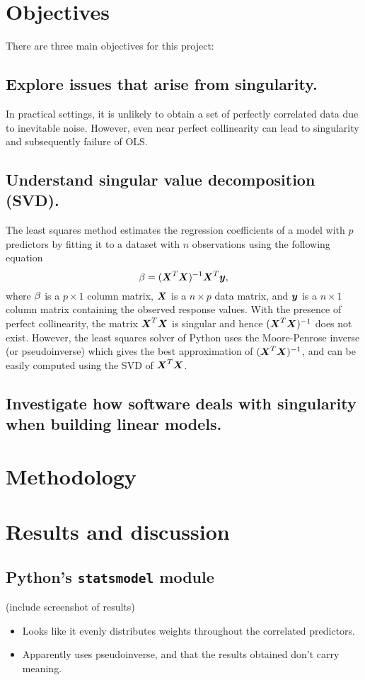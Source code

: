 \documentclass[12pt]{article}
\begin{document}
	\section{Objectives}
	
	There are three main objectives for this project:
	\subsection{Explore issues that arise from singularity.}
	
	In practical settings, it is unlikely to obtain a set of perfectly correlated data due to inevitable noise. However, even near perfect collinearity can lead to singularity and subsequently failure of OLS. 
	
	\subsection{Understand singular value decomposition (SVD).}
	
	The least squares method estimates the regression coefficients of a model with $p$ predictors by fitting it to a dataset with $n$ observations using the following equation
	$$\mathbf{\beta}=(\boldsymbol{X}^T\boldsymbol{X})^{-1}\boldsymbol{X}^T\boldsymbol{y},$$
	where $\mathbf{\beta}$ is a $p\times 1$ column matrix, $\boldsymbol{X}$ is a $n\times p$ data matrix, and $\boldsymbol{y}$ is a $n\times 1$ column matrix containing the observed response values. With the presence of perfect collinearity, the matrix $\boldsymbol{X}^T\boldsymbol{X}$ is singular and hence $(\boldsymbol{X}^T\boldsymbol{X})^{-1}$ does not exist. However, the least squares solver of Python uses the Moore-Penrose inverse (or pseudoinverse) which gives the best approximation of $(\boldsymbol{X}^T\boldsymbol{X})^{-1}$, and can be easily computed using the SVD of $\boldsymbol{X}^T\boldsymbol{X}$.
	
	
	\subsection{Investigate how software deals with singularity when building linear models.}
	
	\section{Methodology}
	
	
	
	\section{Results and discussion}
	\subsection{Python's \texttt{statsmodel} module}
	(include screenshot of results)
	\begin{itemize}
		\item Looks like it evenly distributes weights throughout the correlated predictors.
		\item Apparently uses pseudoinverse, and that the results obtained don't carry meaning.
	\end{itemize}
	
\end{document}

